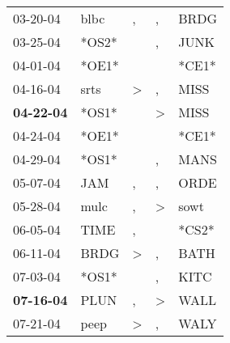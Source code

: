\begin{supertabular}{p{0.07\textwidth}p{0.06\textwidth}p{0.02\textwidth}p{0.02\textwidth}p{0.06\textwidth}}
          03-20-04\textsuperscript{} &           blbc\textsuperscript{} &                , &                , &           BRDG\textsuperscript{} \\
          03-25-04\textsuperscript{} &                            *OS2* &                  &                , &           JUNK\textsuperscript{} \\
          04-01-04\textsuperscript{} &                            *OE1* &                  &                  &                            *CE1* \\
          04-16-04\textsuperscript{} &           srts\textsuperscript{} &     \textgreater &                , &           MISS\textsuperscript{} \\
 \textbf{04-22-04\textsuperscript{}} &                            *OS1* &                  &     \textgreater &           MISS\textsuperscript{} \\
          04-24-04\textsuperscript{} &                            *OE1* &                  &                  &                            *CE1* \\
          04-29-04\textsuperscript{} &                            *OS1* &                  &                , &           MANS\textsuperscript{} \\
          05-07-04\textsuperscript{} &            JAM\textsuperscript{} &                , &                , &           ORDE\textsuperscript{} \\
          05-28-04\textsuperscript{} &           mulc\textsuperscript{} &                , &     \textgreater &           sowt\textsuperscript{} \\
          06-05-04\textsuperscript{} &           TIME\textsuperscript{} &                , &                  &                            *CS2* \\
          06-11-04\textsuperscript{} &           BRDG\textsuperscript{} &     \textgreater &                , &           BATH\textsuperscript{} \\
          07-03-04\textsuperscript{} &                            *OS1* &                  &                , &           KITC\textsuperscript{} \\
 \textbf{07-16-04\textsuperscript{}} &           PLUN\textsuperscript{} &                , &     \textgreater &           WALL\textsuperscript{} \\
          07-21-04\textsuperscript{} &           peep\textsuperscript{} &     \textgreater &                , &           WALY\textsuperscript{} \\

\end{supertabular}
